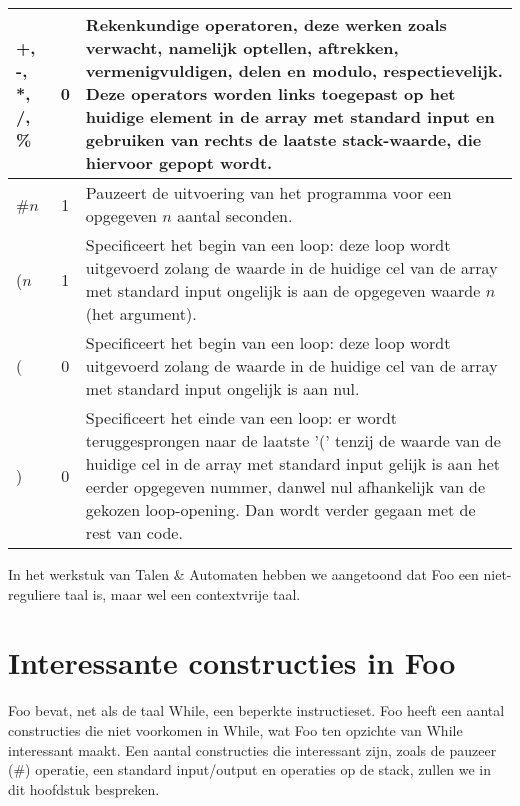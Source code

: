 \documentclass[11pt]{article}
\begin{document}
\begin{center}
\begin{tabular}{ | l | c | p{12cm} | }
    +, -, *, /, \%                          & 0 & Rekenkundige operatoren, deze werken zoals verwacht, namelijk optellen, aftrekken, vermenigvuldigen, delen en modulo, respectievelijk. Deze operators worden links toegepast op het huidige element in de array met standard input en gebruiken van rechts de laatste stack-waarde, die hiervoor gepopt wordt. \\ \hline
    \#\(n\)                                 & 1 & Pauzeert de uitvoering van het programma voor een opgegeven \(n\) aantal seconden. \\ \hline %
    (\(n\)                                  & 1 & Specificeert het begin van een loop: deze loop wordt uitgevoerd zolang de waarde in de huidige cel van de array met standard input ongelijk is aan de opgegeven waarde \(n\) (het argument). \\ \hline
    (                                       & 0 & Specificeert het begin van een loop: deze loop wordt uitgevoerd zolang de waarde in de huidige cel van de array met standard input ongelijk is aan nul. \\ \hline
    )                                       & 0 & Specificeert het einde van een loop: er wordt teruggesprongen naar de laatste '(' tenzij de waarde van de huidige cel in de array met standard input gelijk is aan het eerder opgegeven nummer, danwel nul afhankelijk van de gekozen loop-opening. Dan wordt verder gegaan met de rest van code. \\ \hline
    \hline
    \end{tabular}
\end{center}


In het werkstuk van Talen \& Automaten hebben we aangetoond dat Foo een niet-reguliere taal is, maar wel een contextvrije taal.

\section{Interessante constructies in Foo}

Foo bevat, net als de taal While, een beperkte instructieset. 
Foo heeft een aantal constructies die niet voorkomen in While, wat Foo ten opzichte van While interessant maakt.
Een aantal constructies die interessant zijn, zoals de pauzeer (\#) operatie, een standard input/output en operaties op de stack, zullen we in dit hoofdstuk bespreken. %
\end{document}
